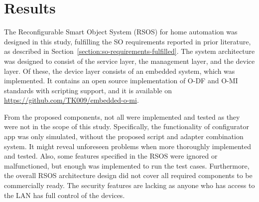 \chapter{Results}
\label{chapter:evaluation}



The Reconfigurable Smart Object System (RSOS) for home automation was designed in this study, fulfilling the SO requirements reported in prior literature, as described in Section~\ref{section:so-requirements-fulfilled}. The system architecture was designed to consist of the service layer, the management layer, and the device layer. Of these, the device layer consists of an embedded system, which was implemented. It contains an open source implementation of O-DF and O-MI standards with scripting support, and it is available on \url{https://github.com/TK009/embedded-o-mi}.

From the proposed components, not all were implemented and tested as they were not in the scope of this study. Specifically, the functionality of configurator app was only simulated, without the proposed script and adapter combination system. It might reveal unforeseen problems when more thoroughly implemented and tested. Also, some features specified in the RSOS were ignored or malfunctioned, but enough was implemented to run the test cases. Furthermore, the overall RSOS architecture design did not cover all required components to be commercially ready. The security features are lacking as anyone who has access to the LAN has full control of the devices.

